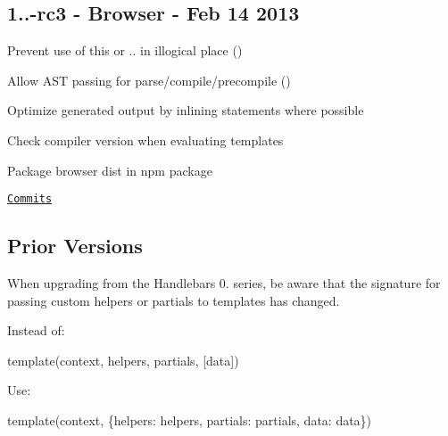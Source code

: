 \subsection*{1..-\/rc3 -\/ Browser -\/ Feb 14 2013}


\begin{DoxyItemize}
\item Prevent use of {\ttfamily this} or {\ttfamily ..} in illogical place (\href{https://github.com/leshill}{\tt })
\item Allow A\+ST passing for {\ttfamily parse}/{\ttfamily compile}/{\ttfamily precompile} (\href{https://github.com/machty}{\tt })
\item Optimize generated output by inlining statements where possible
\item Check compiler version when evaluating templates
\item Package browser dist in npm package
\end{DoxyItemize}

\href{https://github.com/wycats/handlebars.js/compare/v1.0.8...1.0.0-rc.3}{\tt Commits}

\subsection*{Prior Versions}

When upgrading from the Handlebars 0. series, be aware that the signature for passing custom helpers or partials to templates has changed.

Instead of\+:


\begin{DoxyCode}
template(context, helpers, partials, [data])
\end{DoxyCode}


Use\+:


\begin{DoxyCode}
template(context, \{helpers: helpers, partials: partials, data: data\})
\end{DoxyCode}
 